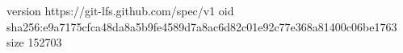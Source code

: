 version https://git-lfs.github.com/spec/v1
oid sha256:e9a7175cfca48da8a5b9fe4589d7a8ac6d82c01e92c77e368a81400c06be1763
size 152703
